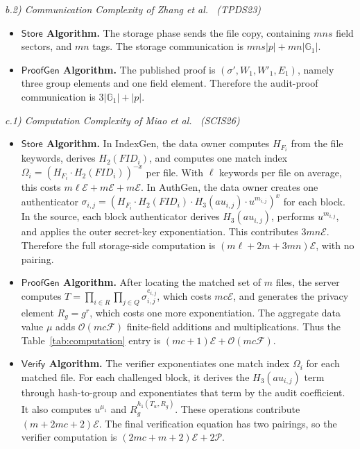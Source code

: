 \documentclass[lettersize,journal]{IEEEtran}
\newcommand{\GG}{\mathbb{G}}
\newcommand{\CompExp}{\mathcal{E}}
\newcommand{\CompPair}{\mathcal{P}}
\newcommand{\CompField}{\mathcal{F}}
\newcommand{\Store}{\mathsf{Store}}
\newcommand{\ProofGen}{\mathsf{ProofGen}}
\newcommand{\Verify}{\mathsf{Verify}}
\begin{document}
\noindent\textit{b.2) Communication Complexity of Zhang et al.~\cite{ZhangTPDS23} (TPDS23)}
\begin{itemize}
\item \textbf{$\Store$ Algorithm.}  The storage phase sends the file copy, containing \(mns\) field sectors, and \(mn\) tags. The storage communication is \(mns|p|+mn|\GG_1|\).
\item \textbf{$\ProofGen$ Algorithm.}  The published proof is \((\sigma',W_1,W'_1,E_1)\), namely three group elements and one field element. Therefore the audit-proof communication is \(3|\GG_1|+|p|\).
\end{itemize}

\noindent\textit{c.1) Computation Complexity of Miao et al.~\cite{MiaoSCIS2026} (SCIS26)}
\begin{itemize}
\item \textbf{$\Store$ Algorithm.}  In IndexGen, the data owner computes \(H_{F_i}\) from the file keywords, derives \(H_2(FID_i)\), and computes one match index \(\Omega_i=(H_{F_i}\cdot H_2(FID_i))^{-x}\) per file. With \(\ell\) keywords per file on average, this costs \(m\ell\CompExp+m\CompExp+m\CompExp\). In AuthGen, the data owner creates one authenticator \(\sigma_{i,j}=(H_{F_i}\cdot H_2(FID_i)\cdot H_3(au_{i,j})\cdot u^{m_{i,j}})^x\) for each block. In the source, each block authenticator derives \(H_3(au_{i,j})\), performs \(u^{m_{i,j}}\), and applies the outer secret-key exponentiation. This contributes \(3mn\CompExp\). Therefore the full storage-side computation is \((m\ell+2m+3mn)\CompExp\), with no pairing.
\item \textbf{$\ProofGen$ Algorithm.}  After locating the matched set of \(m\) files, the server computes \(T=\prod_{i\in R}\prod_{j\in Q}\sigma_{i,j}^{e_{i,j}}\), which costs \(mc\CompExp\), and generates the privacy element \(R_g=g^r\), which costs one more exponentiation. The aggregate data value \(\mu\) adds \(\mathcal{O}(mc\CompField)\) finite-field additions and multiplications. Thus the Table~\ref{tab:computation} entry is \((mc+1)\CompExp+\mathcal{O}(mc\CompField)\).
\item \textbf{$\Verify$ Algorithm.}  The verifier exponentiates one match index \(\Omega_i\) for each matched file. For each challenged block, it derives the \(H_3(au_{i,j})\) term through hash-to-group and exponentiates that term by the audit coefficient. It also computes \(u^{\mu_1}\) and \(R_g^{h_1(T_w,R_g)}\). These operations contribute \((m+2mc+2)\CompExp\). The final verification equation has two pairings, so the verifier computation is \((2mc+m+2)\CompExp+2\CompPair\).
\end{itemize}
\end{document}
